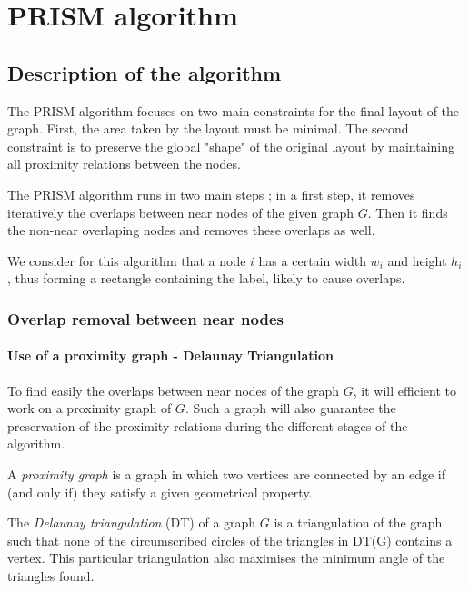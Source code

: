 \documentclass[12pt]{report}
\begin{document}

\chapter{PRISM algorithm}

\section{Description of the algorithm}

The PRISM algorithm focuses on two main constraints for the final layout of the graph. First, the area taken by the layout must be minimal. The second constraint is to preserve the global "shape" of the original layout by maintaining all proximity relations between the nodes.

The PRISM algorithm runs in two main steps ; in a first step, it removes iteratively the overlaps between near nodes of the given graph $G$. Then it finds the non-near overlaping nodes and removes these overlaps as well.

We consider for this algorithm that a node $i$ has a certain width $w_i$ and height $h_i$, thus forming a rectangle containing the label, likely to cause overlaps.

\subsection{Overlap removal between near nodes}

\subsubsection{Use of a proximity graph - Delaunay Triangulation}

To find easily the overlaps between near nodes of the graph $G$, it will efficient to work on a proximity graph of $G$. Such a graph will also guarantee the preservation of the proximity relations during the different stages of the algorithm.

A \emph{proximity graph} is a graph in which two vertices are connected by an edge if (and only if) they satisfy a given geometrical property.

\bigskip

The \emph{Delaunay triangulation} (DT) of a graph $G$ is a triangulation of the graph such that none of the circumscribed circles of the triangles in DT(G) contains a vertex. This particular triangulation also maximises the minimum angle of the triangles found.
\end{document}
